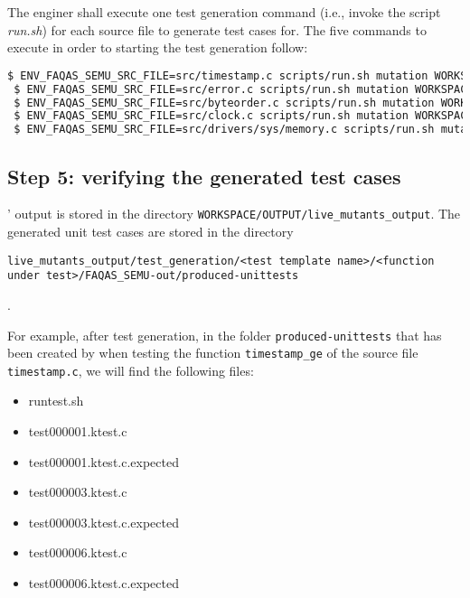The enginer shall execute one test generation command (i.e., invoke the script \emph{run.sh}) for each source file to generate test cases for. The five commands to execute in order to starting the test generation follow:

\begin{lstlisting}[language=bash]
 $ ENV_FAQAS_SEMU_SRC_FILE=src/timestamp.c scripts/run.sh mutation WORKSPACE/DOWNLOADED/live-src.timestamp WORKSPACE/OUTPUT/live_mutants_output
 $ ENV_FAQAS_SEMU_SRC_FILE=src/error.c scripts/run.sh mutation WORKSPACE/DOWNLOADED/live-src.error WORKSPACE/OUTPUT/live_mutants_output
 $ ENV_FAQAS_SEMU_SRC_FILE=src/byteorder.c scripts/run.sh mutation WORKSPACE/DOWNLOADED/live-src.byteorder WORKSPACE/OUTPUT/live_mutants_output
 $ ENV_FAQAS_SEMU_SRC_FILE=src/clock.c scripts/run.sh mutation WORKSPACE/DOWNLOADED/live-src.clock WORKSPACE/OUTPUT/live_mutants_output
 $ ENV_FAQAS_SEMU_SRC_FILE=src/drivers/sys/memory.c scripts/run.sh mutation WORKSPACE/DOWNLOADED/live-src.drivers.sys.memory WORKSPACE/OUTPUT/live_mutants_output
\end{lstlisting}

\subsection{Step 5: verifying the generated test cases}

\SEMUS' output is stored in the directory \texttt{WORKSPACE/OUTPUT/live\_mutants\_output}. The generated unit test cases are stored in the directory \begin{small}\texttt{live\_mutants\_output/test\_generation/<test template name>/<function under test>/FAQAS\_SEMU-out/produced-unittests}\end{small}.

For example, after test generation, in the folder \texttt{produced-unittests} that has been created by \SEMUS when testing the function \texttt{timestamp\_ge}  of the source file \texttt{timestamp.c}, we will find the following files:

\begin{itemize}
\item runtest.sh
\item test000001.ktest.c
\item test000001.ktest.c.expected
\item test000003.ktest.c
\item test000003.ktest.c.expected
\item test000006.ktest.c
\item test000006.ktest.c.expected
\end{itemize}

